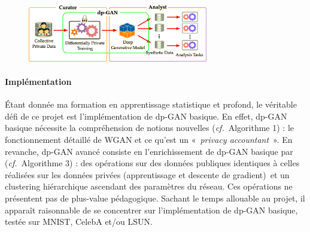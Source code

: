 \documentclass[a4paper,11pt]{article}
\theoremstyle{definition}
\newcommand{\cf}{\textit{cf.}}
\begin{document}
\begin{figure}
    \centering
    \includegraphics[width=0.7\textwidth]{dp-gan_role.png}
    \label{dp-gan_role}
\end{figure}

\paragraph{Implémentation}
Étant donnée ma formation en apprentissage statistique et profond, le véritable défi de ce projet est l'implémentation de dp-GAN basique. En effet, dp-GAN basique nécessite la compréhension de notions nouvelles (\cf\ Algorithme 1) : le fonctionnement détaillé de WGAN et ce qu'est un « \textit{privacy accountant} ». En revanche, dp-GAN avancé consiste en l'enrichissement de dp-GAN basique par (\cf\ Algorithme 3) : des opérations sur des données publiques identiques à celles réalisées sur les données privées (apprentissage et descente de gradient) et un clustering hiérarchique ascendant des paramètres du réseau.
Ces opérations ne présentent pas de plus-value pédagogique. Sachant le temps allouable au projet, il apparaît raisonnable de se concentrer sur l'implémentation de dp-GAN basique, testée sur MNIST, CelebA et/ou LSUN.
\end{document}
